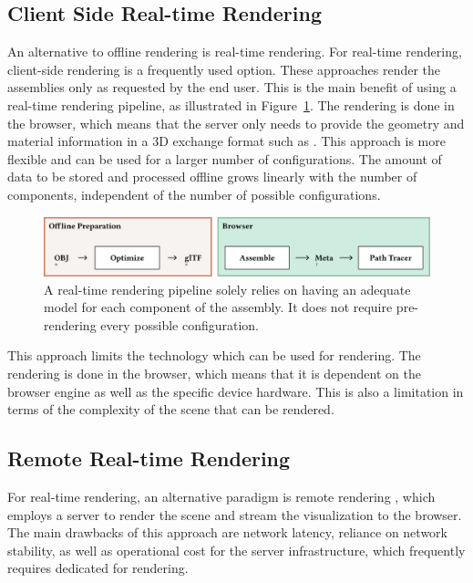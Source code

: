 \subsection*{Client Side Real-time Rendering}

An alternative to offline rendering is real-time rendering. For real-time rendering, client-side rendering is a frequently  used option. These approaches render the assemblies only as requested by the end user. This is the main benefit of using a real-time rendering pipeline, as illustrated in Figure~\ref{fig:cad-online}. The rendering is done in the browser, which means that the server only needs to provide the geometry and material information in a 3D exchange format such as . This approach is more flexible and can be used for a larger number of configurations. The amount of data to be stored and processed offline grows linearly with the number of components, independent of the number of possible configurations.

\begin{figure}[H]
  \includegraphics[width=\columnwidth]{resources/cad-pipeline-online.png}
  \caption{A real-time rendering pipeline solely relies on having an adequate model for each component of the assembly. It does not require pre-rendering every possible configuration.}
  \label{fig:cad-online}
\end{figure}

This approach limits the technology which can be used for rendering. The rendering is done in the browser, which means that it is dependent on the browser engine as well as the specific device hardware. This is also a limitation in terms of the complexity of the scene that can be rendered.

\subsection*{Remote Real-time Rendering}

For real-time rendering, an alternative paradigm is remote rendering \cite{remoteRendering}, which employs a server to render the scene and stream the visualization to the browser. The main drawbacks of this approach are network latency, reliance on network stability, as well as operational cost for the server infrastructure, which frequently requires dedicated  for rendering.

